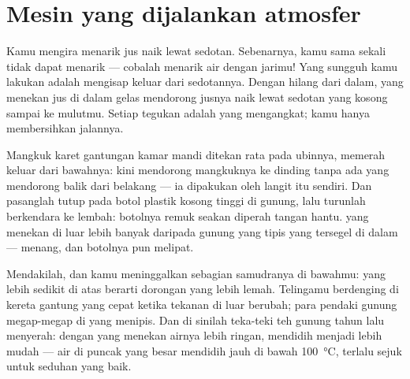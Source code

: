 \section{Mesin yang dijalankan atmosfer}

\begin{example}[Sedotan]\label{ex:g5:air-pressure-weather:straw}
Kamu mengira menarik jus naik lewat sedotan. Sebenarnya, kamu sama
sekali tidak dapat menarik  --- cobalah menarik air dengan
jarimu! Yang sungguh kamu lakukan adalah mengisap \emph{} keluar
dari sedotannya. Dengan  hilang dari dalam,  yang
menekan jus di dalam gelas mendorong jusnya naik lewat sedotan yang
kosong sampai ke mulutmu. Setiap tegukan adalah  yang
mengangkat; kamu hanya membersihkan jalannya.
\end{example}

\begin{example}\label{ex:g5:air-pressure-weather:suction}
Mangkuk karet gantungan kamar mandi ditekan rata pada ubinnya,
memerah  keluar dari bawahnya: kini  mendorong mangkuknya
ke dinding tanpa ada yang mendorong balik dari belakang --- ia
dipakukan oleh langit itu sendiri. Dan pasanglah tutup pada botol
plastik kosong tinggi di gunung, lalu turunlah berkendara ke lembah:
botolnya remuk seakan diperah tangan hantu.  yang menekan di luar
lebih banyak daripada  gunung yang tipis yang tersegel di dalam
---  menang, dan botolnya pun melipat.
\end{example}

\begin{example}\label{ex:g5:air-pressure-weather:height}
Mendakilah, dan kamu meninggalkan sebagian samudranya di bawahmu:
 yang lebih sedikit di atas berarti dorongan yang lebih lemah.
Telingamu berdenging di kereta gantung yang cepat ketika tekanan di
luar berubah; para pendaki gunung megap-megap di  yang menipis.
Dan di sinilah teka-teki teh gunung tahun lalu menyerah: dengan
 yang menekan airnya lebih ringan, mendidih menjadi lebih
mudah --- air di puncak yang besar mendidih jauh di bawah
\qty{100}{\celsius}, terlalu sejuk untuk seduhan yang baik.
\end{example}

